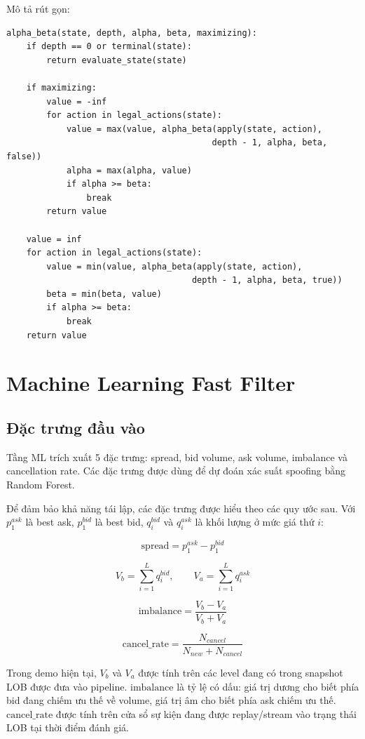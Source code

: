 \documentclass[12pt,a4paper]{report}
\begin{document}
Mô tả rút gọn:

\begin{lstlisting}
alpha_beta(state, depth, alpha, beta, maximizing):
    if depth == 0 or terminal(state):
        return evaluate_state(state)

    if maximizing:
        value = -inf
        for action in legal_actions(state):
            value = max(value, alpha_beta(apply(state, action),
                                         depth - 1, alpha, beta, false))
            alpha = max(alpha, value)
            if alpha >= beta:
                break
        return value

    value = inf
    for action in legal_actions(state):
        value = min(value, alpha_beta(apply(state, action),
                                     depth - 1, alpha, beta, true))
        beta = min(beta, value)
        if alpha >= beta:
            break
    return value
\end{lstlisting}

\chapter{Machine Learning Fast Filter}

\section{Đặc trưng đầu vào}

Tầng ML trích xuất 5 đặc trưng: spread, bid volume, ask volume, imbalance và cancellation rate. Các đặc trưng được dùng để dự đoán xác suất spoofing bằng Random Forest.

Để đảm bảo khả năng tái lập, các đặc trưng được hiểu theo các quy ước sau. Với \(p^{ask}_1\) là best ask, \(p^{bid}_1\) là best bid, \(q^{bid}_i\) và \(q^{ask}_i\) là khối lượng ở mức giá thứ \(i\):

\[
\mathrm{spread}=p^{ask}_1-p^{bid}_1
\]

\[
V_b=\sum_{i=1}^{L} q^{bid}_i,\qquad
V_a=\sum_{i=1}^{L} q^{ask}_i
\]

\[
\mathrm{imbalance}=\frac{V_b-V_a}{V_b+V_a}
\]

\[
\mathrm{cancel\_rate}=\frac{N_{cancel}}{N_{new}+N_{cancel}}
\]

Trong demo hiện tại, \(V_b\) và \(V_a\) được tính trên các level đang có trong snapshot LOB được đưa vào pipeline. \(\mathrm{imbalance}\) là tỷ lệ có dấu: giá trị dương cho biết phía bid đang chiếm ưu thế về volume, giá trị âm cho biết phía ask chiếm ưu thế. \(\mathrm{cancel\_rate}\) được tính trên cửa sổ sự kiện đang được replay/stream vào trạng thái LOB tại thời điểm đánh giá.
\end{document}
